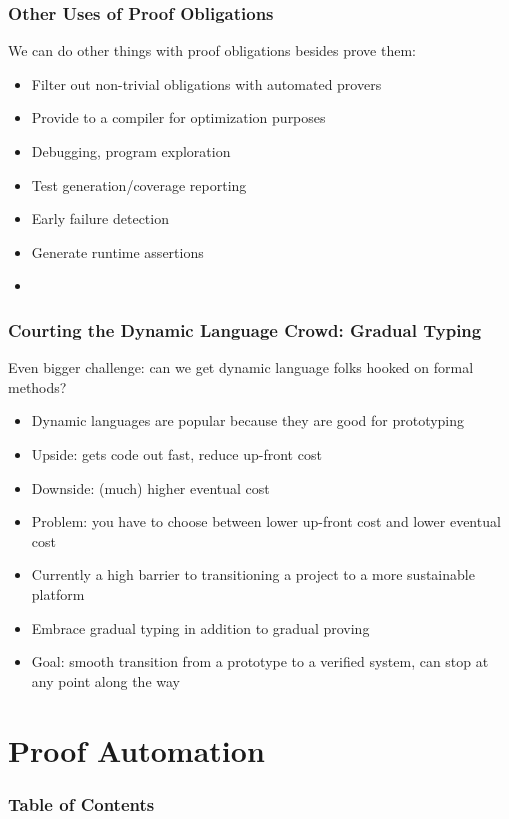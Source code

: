 \documentclass{beamer}
\begin{document}
\begin{frame}
  \frametitle{Other Uses of Proof Obligations}

  We can do other things with proof obligations besides prove them:
  \begin{itemize}
    \item Filter out non-trivial obligations with automated provers
    \item Provide to a compiler for optimization purposes
    \item Debugging, program exploration
    \item Test generation/coverage reporting
    \item Early failure detection
    \item Generate runtime assertions
    \item <insert potential thesis topic here>
  \end{itemize}
\end{frame}

\begin{frame}
  \frametitle{Courting the Dynamic Language Crowd: Gradual Typing}

  Even bigger challenge: can we get dynamic language folks hooked on
  formal methods?
  \begin{itemize}
    \item Dynamic languages are popular because they are good for prototyping
    \item Upside: gets code out fast, reduce up-front cost
    \item Downside: (much) higher eventual cost
    \item Problem: you have to choose between lower up-front cost and
      lower eventual cost
    \item Currently a high barrier to transitioning a project to a
      more sustainable platform
    \item Embrace gradual typing in addition to gradual proving
    \item Goal: smooth transition from a prototype to a verified
      system, can stop at any point along the way
  \end{itemize}
\end{frame}

\section{Proof Automation}

\begin{frame}
  \frametitle{Table of Contents}
  \tableofcontents[currentsection]
\end{frame}
\end{document}
